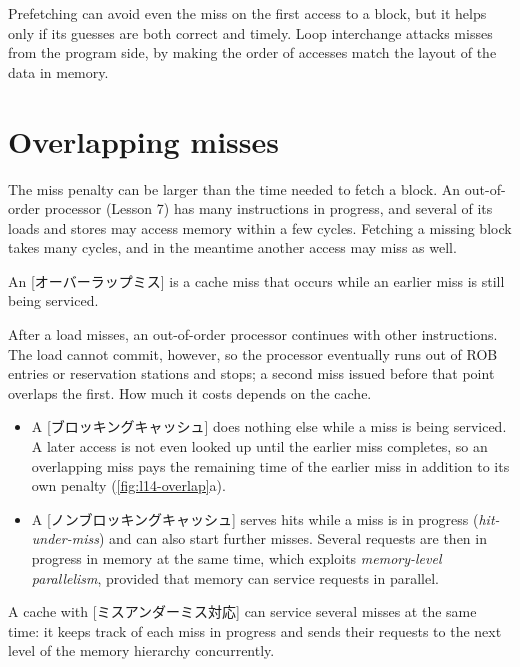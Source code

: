 \documentclass[../main.tex]{subfiles}
\begin{document}
\begin{keypoint}
  Prefetching can avoid even the miss on the first access to a block, but it
  helps only if its guesses are both correct and timely.  Loop interchange
  attacks misses from the program side, by making the order of accesses match
  the layout of the data in memory.
\end{keypoint}

\section{Overlapping misses}
\label{sec:l14-overlap}

The miss penalty can be larger than the time needed to fetch a
block.  An out-of-order processor (Lesson 7)
has many instructions in progress, and several of its loads and stores may
access memory within a few cycles.  Fetching a missing block takes many
cycles, and in the meantime another access may miss as well.

\begin{definition}
  An [オーバーラップミス] is a cache miss that occurs
  while an earlier miss is still being serviced.
\end{definition}

After a load misses, an out-of-order processor continues with other
instructions.  The load cannot commit, however, so the processor eventually
runs out of ROB entries or reservation stations and stops; a second miss
issued before that point overlaps the first.  How much it costs depends on
the cache.
\begin{itemize}
  \item A [ブロッキングキャッシュ] does nothing else
    while a miss is being serviced.  A later access is not even looked up
    until the earlier miss completes, so an overlapping miss pays the
    remaining time of the earlier miss in addition to its own penalty
    (\cref{fig:l14-overlap}a).
  \item A [ノンブロッキングキャッシュ] serves hits
    while a miss is in progress (\emph{hit-under-miss}) and can also start
    further misses.  Several requests are then in progress in memory at the
    same time, which exploits \emph{memory-level parallelism}, provided that
    memory can service requests in parallel.
\end{itemize}

\begin{definition}
  A cache with [ミスアンダーミス対応] can
  service several misses at the same time: it keeps track of each miss in
  progress and sends their requests to the next level of the memory hierarchy
  concurrently.
\end{definition}
\end{document}
